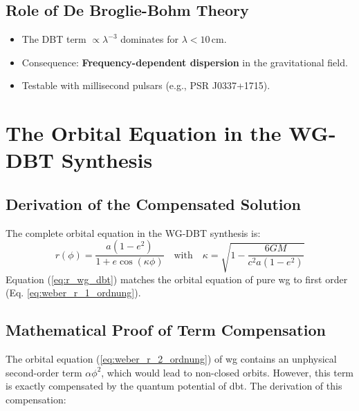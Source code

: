 \subsection*{Role of De Broglie-Bohm Theory}  
\begin{itemize}  
\item The DBT term $\propto \lambda^{-3}$ dominates for $\lambda < 10\,$cm.  
\item Consequence: \textbf{Frequency-dependent dispersion} in the gravitational field.  
\item Testable with millisecond pulsars (e.g., PSR J0337+1715).  
\end{itemize}  

\section{The Orbital Equation in the WG-DBT Synthesis}
\label{sec:bahn_alpha}

\subsection{Derivation of the Compensated Solution}
The complete orbital equation in the WG-DBT synthesis is:
\begin{equation}
    \label{eq:r_wg_dbt}
    r(\phi) = \frac{a(1-e^2)}{1 + e\cos(\kappa\phi)} \quad \text{with} \quad \kappa = \sqrt{1 - \frac{6GM}{c^2a(1-e^2)}}
\end{equation}
Equation (\ref{eq:r_wg_dbt}) matches the orbital equation of pure \gls{wg} to first order (Eq. \ref{eq:weber_r_1_ordnung}).

\subsection{Mathematical Proof of Term Compensation}
\label{sec:bahn_alpha_beweis}
The orbital equation (\ref{eq:weber_r_2_ordnung}) of \gls{wg} contains an unphysical second-order term $\alpha\phi^2$, which would lead to non-closed orbits. However, this term is exactly compensated by the quantum potential of \gls{dbt}. The derivation of this compensation:

